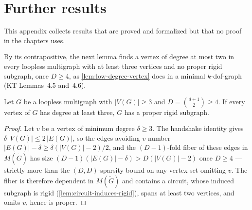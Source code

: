 \section{Further results}
\label{sec:further-results}

This appendix collects results that are proved and formalized but that
no proof in the chapters uses.

By its contrapositive, the next lemma finds a vertex of degree at most
two in every loopless multigraph with at least three vertices and no
proper rigid subgraph, once $D \ge 4$, as \cref{lem:low-degree-vertex}
does in a minimal $k$-dof-graph (KT Lemmas~4.5 and~4.6).

\begin{lemma}
  \label{lem:pencil-min-degree-rigid}
  \leanok
  Let $G$ be a loopless multigraph with $|V(G)| \ge 3$ and $D = \binom{d+1}{2}
  \ge 4$. If every vertex of $G$ has degree at least three, $G$ has a proper
  rigid subgraph.
\end{lemma}
\begin{proof}
  \leanok
  Let $v$ be a vertex of minimum degree $\delta \ge 3$. The handshake
  identity gives $\delta\,|V(G)| \le 2\,|E(G)|$, so the edges avoiding $v$
  number $|E(G)| - \delta \ge \delta(|V(G)|-2)/2$, and the $(D-1)$-fold
  fiber of these edges in $M(\tilde G)$ has size $(D-1)(|E(G)| - \delta) >
  D(|V(G)| - 2)$ once $D \ge 4$ --- strictly more than the $(D,D)$-sparsity
  bound on any vertex set omitting $v$. The fiber is therefore dependent in
  $M(\tilde G)$ and contains a circuit, whose induced subgraph is rigid
  (\cref{lem:circuit-induces-rigid}), spans at least two vertices, and
  omits $v$, hence is proper.
\end{proof}
